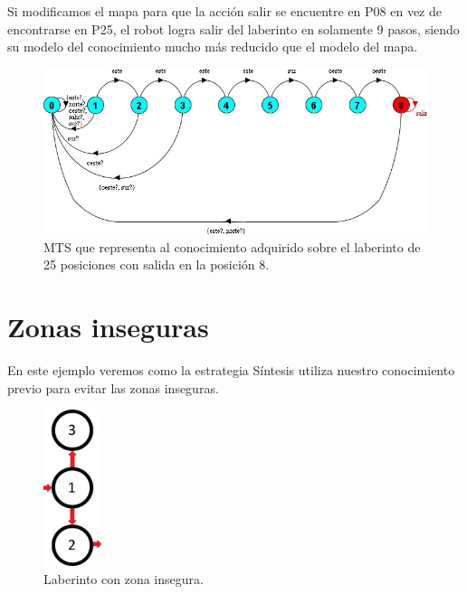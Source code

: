 \vspace{\baselineskip}
Si modificamos el mapa para que la acción salir se encuentre en \textcolor[HTML]{0000A0}{P08} en vez de encontrarse 
en \textcolor[HTML]{0000A0}{P25}, el robot logra salir del laberinto en solamente 9 pasos, siendo su modelo del conocimiento 
mucho más reducido que el modelo del mapa.

\begin{figure}[H]
	\centering
		\includegraphics[width=1.0\textwidth]{Imagenes/Laberintos/25_knowledge_alternativo.jpg}
	\caption{MTS que representa al conocimiento adquirido sobre el laberinto de 25 posiciones con salida en la posición 8.}
	\label{fig:25_knowledge_alternativo}
\end{figure}

\clearpage

\section{Zonas inseguras}

En este ejemplo veremos como la estrategia Síntesis utiliza nuestro conocimiento previo para evitar las zonas inseguras.

\begin{figure}[H]
	\centering
		\includegraphics[width=0.15\textwidth]{Imagenes/Laberintos/unsafe.jpg}
	\caption{Laberinto con zona insegura.}
	\label{fig:unsafe}
\end{figure}

